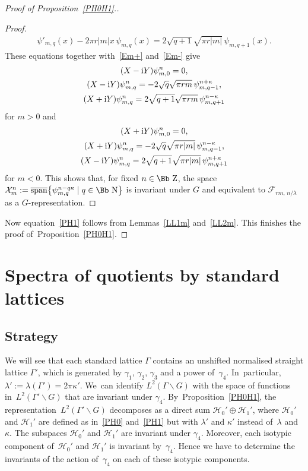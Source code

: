 \documentclass[10pt,a4paper]{amsart}
\newcommand\NN{{\mbox{\Bb N}}}
\newcommand\ZZ{{\mbox{\Bb Z}}}
\newcommand\cH{{\mathcal H}}
\newcommand\cF{{\mathcal F}}
\newcommand{\cSpan}{{\overline{\rm span}}}
\numberwithin{equation}{section}
\begin{document}
\begin{proof}[Proof of Proposition~\ref{PH0H1}.]
\begin{proof}
\begin{gather*}
\psi'_{m,q}(x)-2\pi r|m|x\,\psi_{m,q}(x)=2\sqrt{q+1}\sqrt{\pi r|m|}\,\psi_{m,q+1}(x).%
\end{gather*}
These equations together with~\eqref{Em+} and~\eqref{Em-} give
\begin{gather*}
(X-{\rm i}Y)\psi_{m,0}^{n}=0,%
\\
(X-{\rm i}Y)\psi_{m,q}^{n}=-2\sqrt{q}\sqrt{\pi rm}\,\psi_{m,q-1}^{n+\kappa},
\\
(X+{\rm i}Y)\psi_{m,q}^{n}=2\sqrt{q+1}\sqrt{\pi rm}\,\psi_{m,q+1}^{n-\kappa}
\end{gather*}
for $m>0$ and
\begin{gather*}
(X+{\rm i}Y)\psi_{m,0}^{n}=0,
\\
(X+{\rm i}Y)\psi_{m,q}^{n}=-2\sqrt{q}\sqrt{\pi r|m|}\,\psi_{m,q-1}^{n-\kappa},
\\
(X-{\rm i}Y)\psi_{m,q}^{n}=2\sqrt{q+1}\sqrt{\pi r|m|}\,\psi_{m,q+1}^{n+\kappa}%
\end{gather*}
 for $m<0$. This shows that, for fixed $n\in\ZZ$, the space ${\mathcal X}^{n}_m:=\cSpan\big\{\psi^{n-q\kappa}_{m,q}\mid q\in\NN\big\}$ is invariant under $G$ and equivalent to $\cF_{rm,\,n/\lambda}$ as a $G$-representation.
\end{proof}

Now equation~\eqref{PH1} follows from Lemmas~\ref{LL1m} and~\ref{LL2m}. This finishes the proof of~Pro\-po\-si\-tion~\ref{PH0H1}.
\end{proof}

\section{Spectra of quotients by standard lattices}\label{S8}
\subsection{Strategy} \label{S81}

We will see that each standard lattice $\Gamma$ contains an unshifted normalised straight lattice $\Gamma'$, which is generated by $\gamma_1$, $\gamma_2$, $\gamma_3$ and a power of~$\gamma_4$. In~particular, $\lambda':=\lambda(\Gamma')=2\pi\kappa'$. We~can identify $L^2(\Gamma\backslash G)$ with the space of functions in~$L^2(\Gamma'\backslash G)$ that are invariant under $\gamma_4$. By~Proposition~\ref{PH0H1}, the representation~$L^2(\Gamma'\backslash G)$ decomposes as a direct sum $\cH_0'\oplus\cH_1'$, where $\cH_0'$ and $\cH_1'$ are defined as in~\eqref{PH0} and~\eqref{PH1} but with $\lambda'$ and $\kappa'$ instead of~$\lambda$ and $\kappa$. The subspaces $\cH_0'$ and $\cH_1'$ are invariant under $\gamma_4$. Moreover, each isotypic component of~$\cH_0'$ and $\cH_1'$ is invariant by~$\gamma_4$. Hence we have to determine the invariants of the action of~$\gamma_4$ on each of these isotypic components.
\end{document}
